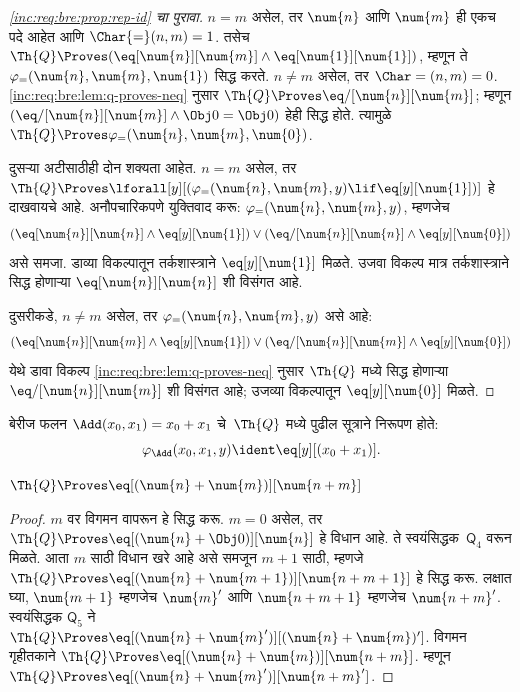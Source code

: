 \begin{proof}[\ref{inc:req:bre:prop:rep-id} चा पुरावा]
$n = m$ असेल, तर $\num{n}$ आणि $\num{m}$ ही एकच पदे आहेत
आणि $\Char{=}(n, m) = 1$. तसेच $\Th{Q} \Proves (\eq[\num{n}][\num{m}] \land
\eq[\num{1}][\num{1}])$, म्हणून ते $\varphi_=(\num{n}, \num{m},
\num{1})$ सिद्ध करते. $n \neq m$ असेल, तर $\Char=(n, m) = 0$.
\ref{inc:req:bre:lem:q-proves-neq} नुसार $\Th{Q} \Proves \eq/[\num{n}][\num{m}]$;
म्हणून $(\eq/[\num{n}][\num{m}] \land \Obj 0 = \Obj 0)$
हेही सिद्ध होते. त्यामुळे $\Th{Q}
\Proves \varphi_=(\num{n}, \num{m}, \num{0})$.

दुसऱ्या अटीसाठीही दोन शक्यता आहेत. $n = m$ असेल, तर
$\Th{Q} \Proves \lforall[y][(\varphi_=(\num{n}, \num{m}, y)
  \lif \eq[y][\num{1}])]$ हे दाखवायचे आहे. अनौपचारिकपणे
युक्तिवाद करू: $\varphi_=(\num{n}, \num{m}, y)$, म्हणजेच
\[(\eq[\num{n}][\num{n}] \land \eq[y][\num{1}]) \lor
(\eq/[\num{n}][\num{n}] \land \eq[y][\num{0}])
\]
असे समजा. डाव्या विकल्पातून तर्कशास्त्राने
$\eq[y][\num{1}]$ मिळते. उजवा विकल्प मात्र
तर्कशास्त्राने सिद्ध होणाऱ्या $\eq[\num{n}][\num{n}]$
शी विसंगत आहे.

दुसरीकडे, $n \neq m$ असेल, तर $\varphi_=(\num{n},
\num{m}, y)$ असे आहे:
\[(\eq[\num{n}][\num{m}] \land \eq[y][\num{1}]) \lor
(\eq/[\num{n}][\num{m}] \land \eq[y][\num{0}])
\]
येथे डावा विकल्प \ref{inc:req:bre:lem:q-proves-neq} नुसार
$\Th{Q}$ मध्ये सिद्ध होणाऱ्या $\eq/[\num{n}][\num{m}]$
शी विसंगत आहे; उजव्या विकल्पातून $\eq[y][\num{0}]$ मिळते.
\end{proof}

\begin{prop}
\label{inc:req:bre:prop:rep-add}
बेरीज फलन $\Add(x_0, x_1) = x_0+x_1$ चे~$\Th{Q}$ मध्ये
पुढील सूत्राने निरूपण होते:
\[  \varphi_{\Add}(x_0, x_1, y) \ident \eq[y][(x_0 + x_1)].
\]
\end{prop}

\begin{lem}
\label{inc:req:bre:lem:q-proves-add}
$\Th{Q} \Proves \eq[(\num{n} + \num{m})][\num{n+m}]$
\end{lem}

\begin{proof}
$m$ वर विगमन वापरून हे सिद्ध करू. $m = 0$ असेल, तर
$\Th{Q} \Proves \eq[(\num{n} + \Obj 0)][\num{n}]$
हे विधान आहे. ते स्वयंसिद्धक~$\mathsf{Q}_4$ वरून मिळते. आता
$m$ साठी विधान खरे आहे असे समजून $m+1$ साठी, म्हणजे
$\Th{Q} \Proves \eq[(\num{n} +
  \num{m+1})][\num{n+m+1}]$ हे सिद्ध करू. लक्षात घ्या,
$\num{m+1}$ म्हणजेच $\num{m}'$ आणि $\num{n+m+1}$ म्हणजेच
$\num{n+m}'$. स्वयंसिद्धक $\mathsf{Q}_5$ ने $\Th{Q}
\Proves \eq[(\num{n} + \num{m}')][(\num{n}+\num{m})']$.
विगमन गृहीतकाने $\Th{Q} \Proves \eq[(\num{n} + \num{m})][\num{n+m}]$.
म्हणून $\Th{Q} \Proves \eq[(\num{n} + \num{m}')][\num{n+m}']$.
\end{proof}

